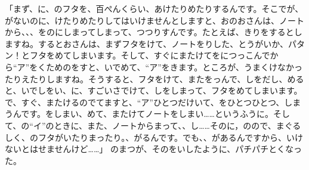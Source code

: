 「まず、に、のフタを、百ぺんくらい、あけたりめたりするんです。そこでが、がないのに、けたりめたりしてはいけませんとしますと、おのおさんは、ノートから、、、をのにしまってしまって、つつりすんです。たとえば、きりをするとしますね。するとおさんは、まずフタをけて、ノートをりした、とうがいか、パタン！とフタをめてしまいます。そして、すぐにまたけてをにつっこんでから“ア”をくためのをすと、いでめて、“ア”をきます。ところが、うまくけなかったりえたりしますね。そうすると、フタをけて、またをっんで、しをだし、めると、いでしをい、に、すごいさでけて、しをしまって、フタをめてしまいます。で、すぐ、またけるのでてますと、“ア”ひとつだけいて、をひとつひとつ、しまうんです。をしまい、めて、またけてノートをしまい……というふうに。そして、の“イ”のときに、また、ノートからまって、、し……そのに，のので、まぐるしく、のフタがいたりまったり。、がるんです。でも、、があるんですから、いけないとはせませんけど……」 のまつが、そのをいしたように、パチパチとくなった。

